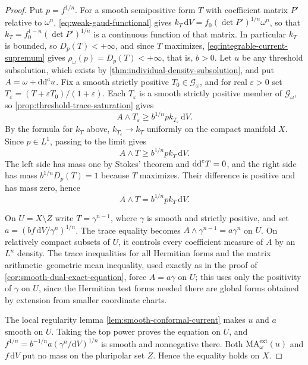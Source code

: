\begin{proof}
Put $p=f^{1/n}$. For a smooth semipositive form $T$ with coefficient matrix $P'$ relative to $\omega^n$, \eqref{eq:weak-gaud-functional} gives $k_T\,\mathrm{d}V=f_0(\det P')^{1/n}\omega^n$, so that $k_T=f_0^{1-n}(\det P')^{1/n}$ is a continuous function of that matrix. In particular $k_T$ is bounded, so $D_p(T)<+\infty$, and since $T$ maximizes, \eqref{eq:integrable-current-supremum} gives $\rho_\omega(p)=D_p(T)<+\infty$, that is, $b>0$. Let $u$ be any threshold subsolution, which exists by \cref{thm:individual-density-subsolution}, and put $A=\omega+\mathrm{dd}^{\mathrm{c}} u$. Fix a smooth strictly positive $T_0\in\mathscr G_\omega$, and for real $\varepsilon>0$ set $T_\varepsilon=(T+\varepsilon T_0)/(1+\varepsilon)$. Each $T_\varepsilon$ is a smooth strictly positive member of $\mathscr G_\omega$, so \cref{prop:threshold-trace-saturation} gives
\[
 A\wedge T_\varepsilon\geq b^{1/n}p k_{T_\varepsilon}\,\mathrm{d}V.
\]
By the formula for $k_T$ above, $k_{T_\varepsilon}\to k_T$ uniformly on the compact manifold $X$. Since $p\in L^1$, passing to the limit gives
\[
 A\wedge T\geq b^{1/n}p k_T\,\mathrm{d}V.
\]
The left side has mass one by Stokes' theorem and $\mathrm{dd}^{\mathrm{c}} T=0$, and the right side has mass $b^{1/n}D_p(T)=1$ because $T$ maximizes. Their difference is positive and has mass zero, hence
\begin{equation}\label{eq:semipositive-dual-trace-equality}
 A\wedge T=b^{1/n}p k_T\,\mathrm{d}V.
\end{equation}

On $U=X\setminus Z$ write $T=\gamma^{n-1}$, where $\gamma$ is smooth and strictly positive, and set $a=(bf\,\mathrm{d}V/\gamma^n)^{1/n}$. The trace equality becomes $A\wedge\gamma^{n-1}=a\gamma^n$ on $U$. On relatively compact subsets of $U$, it controls every coefficient measure of $A$ by an $L^n$ density. The trace inequalities for all Hermitian forms and the matrix arithmetic--geometric mean inequality, used exactly as in the proof of \cref{cor:smooth-dual-exact-equation}, force $A=a\gamma$ on $U$; this uses only the positivity of $\gamma$ on $U$, since the Hermitian test forms needed there are global forms obtained by extension from smaller coordinate charts.

The local regularity lemma \cref{lem:smooth-conformal-current} makes $u$ and $a$ smooth on $U$. Taking the top power proves the equation on $U$, and $f^{1/n}=b^{-1/n}a(\gamma^n/\mathrm{d}V)^{1/n}$ is smooth and nonnegative there. Both $\mathrm{MA}^{\mathrm{ext}}_\omega(u)$ and $f\,\mathrm{d}V$ put no mass on the pluripolar set $Z$. Hence the equality holds on $X$.


\end{proof}

